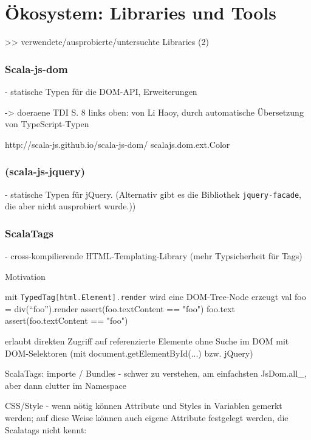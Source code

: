 \documentclass[a4paper, 12pt, hidelinks, listof=totoc, listoftables=totoc, bibliography=totoc]{scrreprt}
\newcommand{\code}[1]{\lstinline[language=Scala, style=inline]|#1|}
\newcommand{\scala}[1]{\lstinline[language=Scala, style=inline]|#1|}
\begin{document}
\section{Ökosystem: Libraries und Tools}\label{sec:sjs-libs}

>> verwendete/ausprobierte/untersuchte Libraries (2)

\subsubsection{Scala-js-dom}

- statische Typen für die DOM-API, Erweiterungen

-> doeraene TDI S. 8 links oben:
	von Li Haoy, durch automatische Übersetzung von TypeScript-Typen

http://scala-js.github.io/scala-js-dom/
scalajs.dom.ext.Color

\subsubsection{(scala-js-jquery)}

- statische Typen für jQuery. (Alternativ gibt es die Bibliothek \code{jquery-facade}, die aber nicht ausprobiert wurde.))

\subsubsection{ScalaTags}

- cross-kompilierende HTML-Templating-Library (mehr Typsicherheit für Tags)

Motivation



mit \scala{TypedTag[html.Element].render} wird eine DOM-Tree-Node erzeugt
  val foo = div("`foo"').render
  assert(foo.textContent == "foo")
  foo.text
  assert(foo.textContent == "foo")

erlaubt direkten Zugriff auf referenzierte Elemente ohne Suche im DOM mit DOM-Selektoren (mit document.getElementById(...) bzw. jQuery)

ScalaTags: importe / Bundles - schwer zu verstehen, am einfachsten JsDom.all\_, aber dann clutter im Namespace

CSS/Style - wenn nötig können Attribute und Styles in Variablen gemerkt werden; auf diese Weise können auch eigene Attribute festgelegt werden, die Scalatags nicht kennt:
\end{document}
